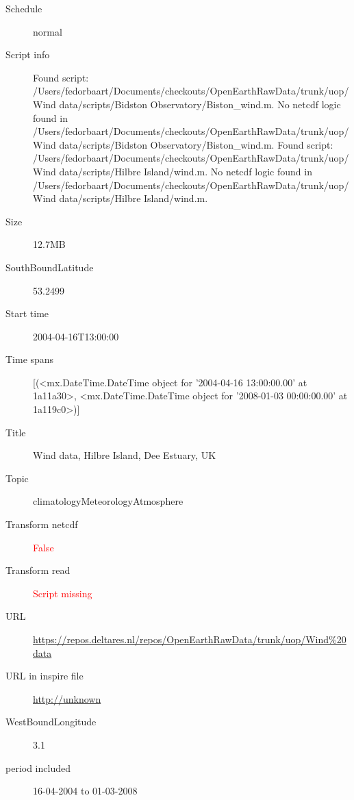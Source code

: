 \documentclass[9]{report}
\begin{document}
\begin{description}
\begin{verbatim}
\end{verbatim}
  \item[Schedule] normal
  \item[Script info] Found script: /Users/fedorbaart/Documents/checkouts/OpenEarthRawData/trunk/uop/Wind data/scripts/Bidston Observatory/Biston\_wind.m.
No netcdf logic found in /Users/fedorbaart/Documents/checkouts/OpenEarthRawData/trunk/uop/Wind data/scripts/Bidston Observatory/Biston\_wind.m.
Found script: /Users/fedorbaart/Documents/checkouts/OpenEarthRawData/trunk/uop/Wind data/scripts/Hilbre Island/wind.m.
No netcdf logic found in /Users/fedorbaart/Documents/checkouts/OpenEarthRawData/trunk/uop/Wind data/scripts/Hilbre Island/wind.m.
  \item[Size] 12.7MB
  \item[SouthBoundLatitude] 53.2499
  \item[Start time] 2004-04-16T13:00:00
  \item[Time spans] [(<mx.DateTime.DateTime object for '2004-04-16 13:00:00.00' at 1a11a30>, <mx.DateTime.DateTime object for '2008-01-03 00:00:00.00' at 1a119c0>)]
  \item[Title]  Wind data, Hilbre Island, Dee Estuary, UK 
  \item[Topic] climatologyMeteorologyAtmosphere
  \item[Transform netcdf] \textcolor{red}{False}
  \item[Transform read] \textcolor{red}{Script missing}
  \item[URL] \href{https://repos.deltares.nl/repos/OpenEarthRawData/trunk/uop/Wind\%20data}{https://repos.deltares.nl/repos/OpenEarthRawData/trunk/uop/Wind\%20data}
  \item[URL in inspire file] \href{http://unknown}{http://unknown}
  \item[WestBoundLongitude] 3.1
  \item[period included] 16-04-2004 to 01-03-2008
\end{description}
\end{document}
